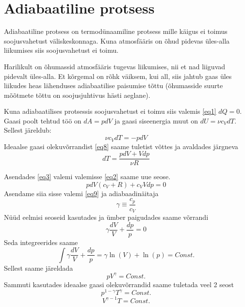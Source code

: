 \documentclass{trkut}%
\begin{document}
\section{Adiabaatiline protsess}
Adiabaatiline protsess on termodünaamiline protsess mille käigus ei toimus soojusvahetust väliskeskonnaga. Kuna atmosfääris on õhud pidevas üles-alla liikumises siis soojusvahetust ei toimu.

Harilikult on õhumassid atmosfääris tugevas liikumises, nii et nad liiguvad pidevalt üles-alla. Et kõrgemal on rõhk väiksem, kui all, siis jahtub gaas üles liikudes heas lähenduses adiabaatilise paisumise tõttu (õhumasside suurte mõõtmete tõttu on soojusjuhtivus hästi aeglane).



Kuna adiabaatilises protsessis soojusvahetust ei toimu siis valemis \ref{eq1} $dQ=0$. Gaasi poolt tehtud töö on $d A=pdV$ ja gaasi siseenergia muut on $dU=\nu c_VdT$. Sellest järeldub:
\begin{equation}\label{eq2}
\nu c_VdT = -pdV
\end{equation}
Ideaalse gaasi olekuvõrrandist \ref{eq8} saame tuletist võttes ja avaldades järgneva
\begin{equation}\label{eq3}
dT = \frac{pdV+Vdp}{\nu R}
\end{equation}

Asendades \ref{eq3} valemi valemisse \ref{eq2} saame uue seose.
\begin{equation}\label{eq4}
pdV(c_V+R)+c_VVdp=0
\end{equation}
Asendame siia sisse valemi \ref{eq9} ja adiabaadinäitaja
\begin{equation}
\gamma \equiv \frac{c_p}{c_V}
\end{equation}
Nüüd eelmisi seoseid kasutades ja ümber paigudades saame võrrandi
\begin{equation}
\gamma \frac{dV}{V} + \frac{dp}{p} = 0
\end{equation}
Seda integreerides saame
\begin{equation}
 \int \gamma \frac{dV}{V} + \frac{dp}{p} = \gamma \ln(V) + \ln(p) = Const.
\end{equation}
Sellest saame järeldada
\begin{equation}
pV^\gamma = Const.
\end{equation}
Sammuti kasutades ideaalse gaasi olekuvõrrandid saame tuletada veel 2 seost
\begin{equation}\label{eq13}
p^{1-\gamma}T^\gamma = Const.
\end{equation}
\begin{equation}
V^{\gamma-1}T = Const.
\end{equation}
\end{document}
